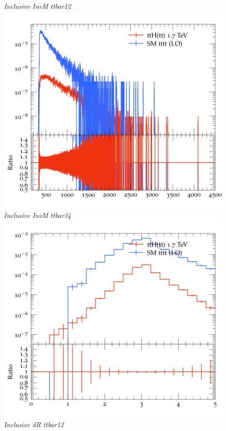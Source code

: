 \documentclass{beamer}
\begin{document}
\begin{frame}
\begin{columns}
\textit{\small Inclusive InvM ttbar12}
\includegraphics[width=\textwidth]{../plots/ttH_1700/tttt_ttH/Inclusive_InvM_ttbar34.png}\\
\textit{\small Inclusive InvM ttbar34}
\includegraphics[width=\textwidth]{../plots/ttH_1700/tttt_ttH/Inclusive_dR_ttbar12.png}\\
\textit{\small Inclusive dR ttbar12}
\end{columns}
\end{frame}
\end{document}
